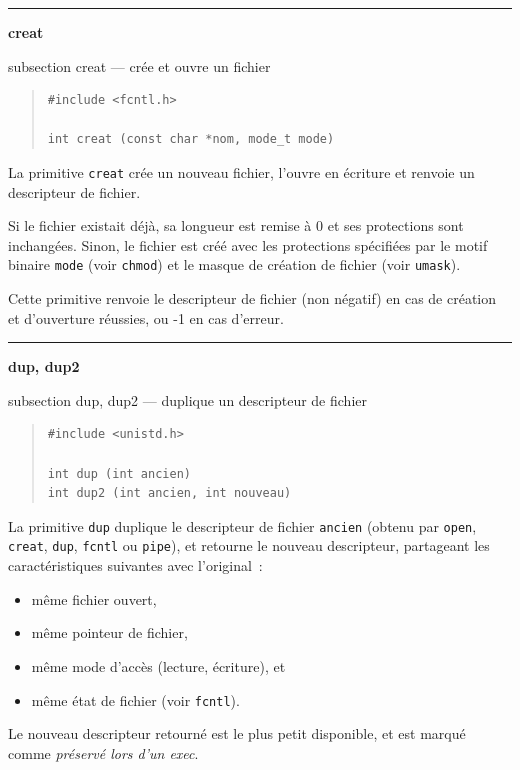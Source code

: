 \documentclass [twoside] {report}
\newcommand {\primitive} [1]
    {
	\phantomsection
	{\large \textbf {#1}}
	\addcontentsline {toc} {subsection} {#1}
    }
\newcommand {\separation}
    {
	\vspace {5mm}
	\nopagebreak
	\hrule
    }
\begin{document}
\separation
\primitive {creat} --- crée et ouvre un fichier

\begin {quote}
\begin {verbatim}
#include <fcntl.h>

int creat (const char *nom, mode_t mode)
\end{verbatim}
\end {quote}

La primitive \texttt {creat} crée un nouveau fichier,
l'ouvre en écriture et renvoie un descripteur de
fichier.

Si le fichier existait déjà, sa longueur est
remise à 0 et ses protections sont inchangées.
Sinon, le fichier est créé avec les protections
spécifiées par le motif binaire \texttt {mode} (voir
\texttt {chmod}) et le masque de création de fichier
(voir \texttt {umask}).

Cette primitive renvoie le descripteur de fichier
(non négatif) en cas de création et d'ouverture
réussies, ou -1 en cas d'erreur.




\separation
\primitive {dup, dup2} --- duplique un descripteur de fichier

\begin {quote}
\begin {verbatim}
#include <unistd.h>

int dup (int ancien)
int dup2 (int ancien, int nouveau)
\end{verbatim}
\end {quote}

La primitive \texttt {dup} duplique le descripteur de
fichier \texttt {ancien} (obtenu par \texttt {open}, \texttt {creat},
\texttt {dup}, \texttt {fcntl} ou \texttt {pipe}), et retourne le
nouveau descripteur, partageant les
caractéristiques suivantes avec l'original~:

\begin {itemize}
    \item même fichier ouvert,
    \item même pointeur de fichier,
    \item même mode d'accès (lecture, écriture), et
    \item même état de fichier (voir \texttt {fcntl}).
\end {itemize}

Le nouveau descripteur retourné est le plus petit
disponible, et est marqué comme \textit {préservé lors
d'un exec}.
\end{document}
